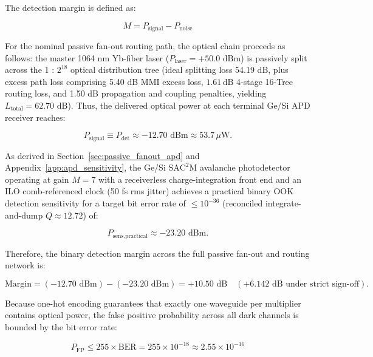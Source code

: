 \documentclass[journal]{IEEEtran}
\begin{document}
The detection margin is defined as:

\begin{equation}
M = P_{\text{signal}} - P_{\text{noise}}
\end{equation}

For the nominal passive fan-out routing path, the optical chain proceeds as follows: the master 1064 nm Yb-fiber laser ($P_{\text{laser}} = +50.0\text{ dBm}$) is passively split across the 1 : $2^{18}$ optical distribution tree (ideal splitting loss 54.19 dB, plus excess path loss comprising 5.40 dB MMI excess loss, $1.61\,\text{dB}$ 4-stage 16-Tree routing loss, and 1.50 dB propagation and coupling penalties, yielding $L_{\text{total}} = 62.70\text{ dB}$). Thus, the delivered optical power at each terminal Ge/Si APD receiver reaches:

\begin{equation}
P_{\text{signal}} \equiv P_{\text{det}} \approx -12.70\text{ dBm} \approx 53.7\,\mu\text{W}.
\end{equation}

As derived in Section~\ref{sec:passive_fanout_apd} and Appendix~\ref{app:apd_sensitivity}, the Ge/Si $\mathrm{SAC^2M}$ avalanche photodetector operating at gain $M = 7$ with a receiverless charge-integration front end and an ILO comb-referenced clock (50 fs rms jitter) achieves a practical binary OOK detection sensitivity for a target bit error rate of $\le 10^{-36}$ (reconciled integrate-and-dump $Q \approx 12.72$) of:

\begin{equation}
P_{\text{sens,practical}} \approx -23.20\text{ dBm}.
\end{equation}

Therefore, the binary detection margin across the full passive fan-out and routing network is:

\begin{equation}
\text{Margin} = (-12.70\text{ dBm}) - (-23.20\text{ dBm}) = +10.50\text{ dB} \quad (+6.142\text{ dB under strict sign-off}).
\end{equation}

Because one-hot encoding guarantees that exactly one waveguide per multiplier contains optical power, the false positive probability across all dark channels is bounded by the bit error rate:

\begin{equation}
P_{\mathrm{FP}} \le 255 \times \mathrm{BER} = 255 \times 10^{-18} \approx 2.55 \times 10^{-16}
\end{equation}
\end{document}

